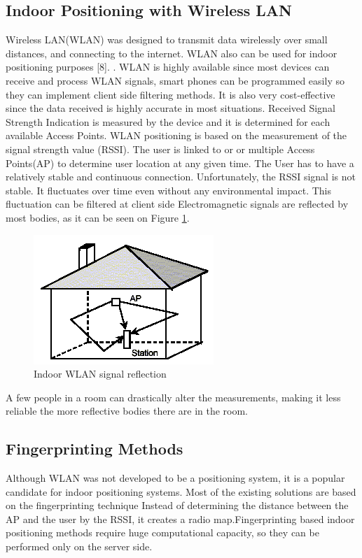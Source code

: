 \subsection{Indoor Positioning with Wireless LAN}
	Wireless LAN(WLAN) was designed to transmit data wirelessly over small distances, and connecting to the internet. WLAN also can be used for indoor positioning purposes [8]. \cite{evennou2006advanced}. WLAN is highly available since most devices can receive and process WLAN signals, smart phones can be programmed easily so they can implement client side filtering methods. It is also very cost-effective since the data received is highly accurate in most situations. Received Signal Strength Indication is measured by the device and it is determined for each available Access Points.
	 WLAN positioning is based on the measurement of the signal strength value (RSSI). The user  is linked to or or multiple Access Points(AP) to determine user location at any given time. The User has to have a relatively stable and continuous connection. Unfortunately, the RSSI signal is not stable. It fluctuates over time even without any environmental impact. This fluctuation can be filtered at client side Electromagnetic signals are reflected \cite{kjaergaard2012mobile} by most bodies, as it can be seen on Figure \ref{fig:kockahaz}.
	\begin{figure}[h]
		\centering
		\includegraphics[width=.3\linewidth]{figures/Reflect.png}
		\caption{Indoor WLAN signal reflection \cite{Reflections}}\label{fig:kockahaz}
	\end{figure}
	 A few people in a room can drastically alter the measurements, making it less reliable the more reflective bodies there are in the room. 

\subsection{Fingerprinting Methods}
	Although WLAN was not developed to be a positioning system, it is a popular candidate for indoor positioning systems.  Most of the existing solutions are based on the fingerprinting technique \cite{kaemarungsi2004properties}\cite{honkavirta2009comparative}  Instead of determining the distance between the AP and the user by the  RSSI, it creates a radio map.Fingerprinting based indoor positioning methods require huge computational capacity, so they can be performed only on the server side.
	
